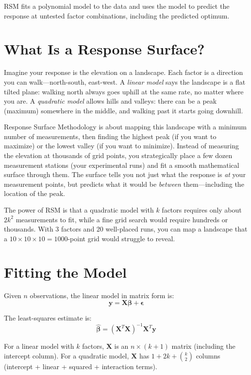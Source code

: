 \documentclass[11pt]{book}
\begin{document}
RSM fits a polynomial model to the data and uses the model to predict the
response at untested factor combinations, including the predicted optimum.

\section{What Is a Response Surface?}

Imagine your response is the elevation on a landscape. Each factor is a
direction you can walk---north-south, east-west. A \emph{linear model} says the
landscape is a flat tilted plane: walking north always goes uphill at the same
rate, no matter where you are. A \emph{quadratic model} allows hills and
valleys: there can be a peak (maximum) somewhere in the middle, and walking past
it starts going downhill.

Response Surface Methodology is about mapping this landscape with a minimum
number of measurements, then finding the highest peak (if you want to maximize)
or the lowest valley (if you want to minimize). Instead of measuring the
elevation at thousands of grid points, you strategically place a few dozen
measurement stations (your experimental runs) and fit a smooth mathematical
surface through them. The surface tells you not just what the response is
\emph{at} your measurement points, but predicts what it would be \emph{between}
them---including the location of the peak.

The power of RSM is that a quadratic model with $k$ factors requires only about
$2k^2$ measurements to fit, while a fine grid search would require hundreds or
thousands. With 3 factors and 20 well-placed runs, you can map a landscape that
a $10 \times 10 \times 10 = 1000$-point grid would struggle to reveal.

\section{Fitting the Model}

Given $n$ observations, the linear model in matrix form is:
\[
\mathbf{y} = \mathbf{X}\boldsymbol{\beta} + \boldsymbol{\epsilon}
\]

The least-squares estimate is:
\[
\hat{\boldsymbol{\beta}} = (\mathbf{X}^T\mathbf{X})^{-1}\mathbf{X}^T\mathbf{y}
\]

For a linear model with $k$ factors, $\mathbf{X}$ is an $n \times (k+1)$ matrix
(including the intercept column). For a quadratic model, $\mathbf{X}$ has
$1 + 2k + \binom{k}{2}$ columns (intercept + linear + squared + interaction
terms).
\end{document}
